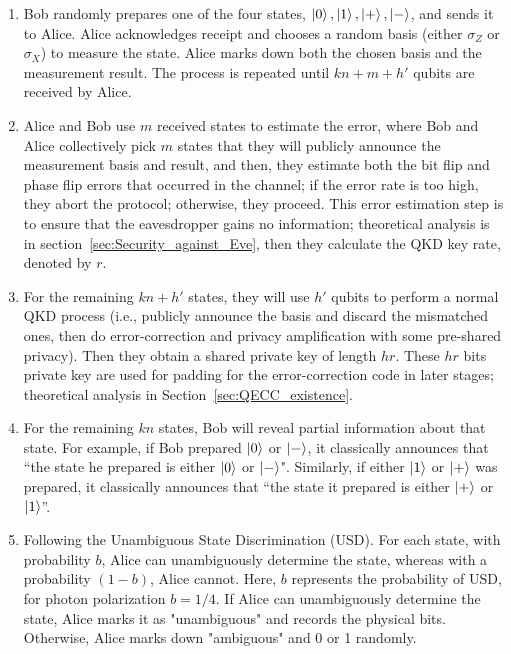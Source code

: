 \documentclass[%
 reprint,
superscriptaddress,
 amsmath,amssymb,
 aps,
]{revtex4-2}
\begin{document}
\begin{enumerate}

    \item Bob randomly prepares one of the four states, $\ket{0}, \ket{1}, \ket{+}, \ket{-}$, and sends it to Alice. Alice acknowledges receipt and chooses a random basis (either $\sigma_Z$ or $\sigma_X$) to measure the state. Alice marks down both the chosen basis and the measurement result. The process is repeated until $kn+m+h'$ qubits are received by Alice.

    \item Alice and Bob use $m$ received states to estimate the error, where Bob and Alice collectively pick $m$ states that they will publicly announce the measurement basis and result, and then, they estimate both the bit flip and phase flip errors that occurred in the channel; if the error rate is too high, they abort the protocol; otherwise, they proceed. This error estimation step is to ensure that the eavesdropper gains no information; theoretical analysis is in section~\ref{sec:Security_against_Eve}, then they calculate the QKD key rate, denoted by $r$.

    \item For the remaining $kn+h'$ states, they will use $h'$ qubits to perform a normal QKD process (i.e., publicly announce the basis and discard the mismatched ones, then do error-correction and privacy amplification with some pre-shared privacy). Then they obtain a shared private key of length $hr$. These $hr$ bits private key are used for padding for the error-correction code in later stages; theoretical analysis in Section~\ref{sec:QECC_existence}. 

    \item For the remaining $kn$ states, Bob will reveal partial information about that state. For example, if Bob prepared $\ket{0}$ or $\ket{-}$, it classically announces that ``the state he prepared is either $\ket{0}$ or $\ket{-}$". Similarly, if either $\ket{1}$ or $\ket{+}$ was prepared, it classically announces that ``the state it prepared is either $\ket{+}$ or $\ket{1}$''. 

    \item Following the Unambiguous State Discrimination (USD). For each state, with probability $b$, Alice can unambiguously determine the state, whereas with a probability $(1-b)$, Alice cannot. Here, $b$ represents the probability of USD, for photon polarization $b=1/4$. If Alice can unambiguously determine the state, Alice marks it as "unambiguous" and records the physical bits. Otherwise, Alice marks down "ambiguous" and 0 or 1 randomly.



\end{enumerate}
\end{document}

